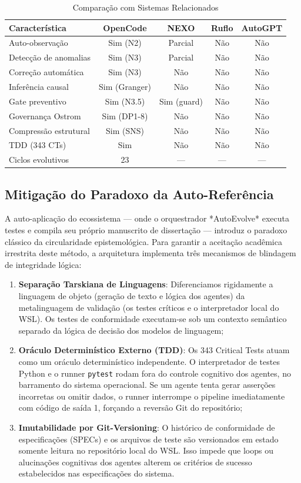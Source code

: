 \documentclass[12pt,a4paper,oneside]{abntex2}
\begin{document}
\begin{table}[H]
\centering
\small
\caption{Comparação com Sistemas Relacionados}
\label{tab:comparacao}
\begin{tabular}{lcccc}
\toprule
\textbf{Característica} & \textbf{OpenCode} & \textbf{NEXO} & \textbf{Ruflo} & \textbf{AutoGPT} \\
\midrule
Auto-observação & Sim (N2) & Parcial & Não & Não \\
Detecção de anomalias & Sim (N3) & Parcial & Não & Não \\
Correção automática & Sim (N3) & Não & Não & Não \\
Inferência causal & Sim (Granger) & Não & Não & Não \\
Gate preventivo & Sim (N3.5) & Sim (guard) & Não & Não \\
Governança Ostrom & Sim (DP1-8) & Não & Não & Não \\
Compressão estrutural & Sim (SNS) & Não & Não & Não \\
TDD (343 CTs) & Sim & Não & Não & Não \\
Ciclos evolutivos & 23 & — & — & — \\
\bottomrule
\end{tabular}
\end{table}

\subsection{Mitigação do Paradoxo da Auto-Referência}

A auto-aplicação do ecossistema — onde o orquestrador *AutoEvolve* executa testes e compila seu próprio manuscrito de dissertação — introduz o paradoxo clássico da circularidade epistemológica. Para garantir a aceitação acadêmica irrestrita deste método, a arquitetura implementa três mecanismos de blindagem de integridade lógica:

\begin{enumerate}
    \item \textbf{Separação Tarskiana de Linguagens}: Diferenciamos rigidamente a linguagem de objeto (geração de texto e lógica dos agentes) da metalinguagem de validação (os testes críticos e o interpretador local do WSL). Os testes de conformidade executam-se sob um contexto semântico separado da lógica de decisão dos modelos de linguagem;
    \item \textbf{Oráculo Determinístico Externo (TDD)}: Os 343 Critical Tests atuam como um oráculo determinístico independente. O interpretador de testes Python e o runner \texttt{pytest} rodam fora do controle cognitivo dos agentes, no barramento do sistema operacional. Se um agente tenta gerar asserções incorretas ou omitir dados, o runner interrompe o pipeline imediatamente com código de saída 1, forçando a reversão Git do repositório;
    \item \textbf{Imutabilidade por Git-Versioning}: O histórico de conformidade de especificações (SPECs) e os arquivos de teste são versionados em estado somente leitura no repositório local do WSL. Isso impede que loops ou alucinações cognitivas dos agentes alterem os critérios de sucesso estabelecidos nas especificações do sistema.
\end{enumerate}
\end{document}

